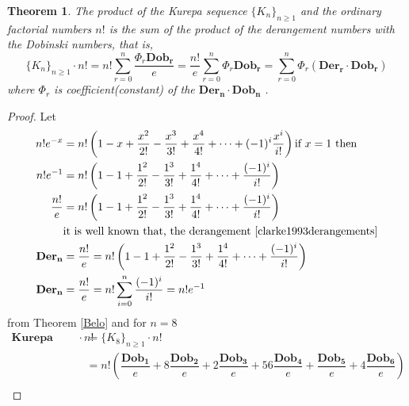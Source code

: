 \documentclass[pdflatex,sn-mathphys-num]{sn-jnl}%
\newtheorem{theorem}{Theorem}
\theoremstyle{thmstyleone}%
\theoremstyle{thmstyletwo}%
\theoremstyle{thmstylethree}%
\begin{document}
\begin{theorem}\label{ok}
    The product of the Kurepa sequence $ \lbrace K_n\rbrace_{n\geq 1}$ and the ordinary factorial numbers $n!$ is the sum of the product of the derangement numbers with the Dobinski numbers, that is, 
        $$\lbrace K_n\rbrace_{n\geq 1} \cdotp n!= n!\sum_{r=0}^{n} \dfrac{\Phi_r \mathbf{Dob_r}}{e} = \dfrac{n!}{e}  \sum_{r=0}^{n} \Phi_r \mathbf{Dob_r}=\sum_{r=0}^{n} \Phi_r (\mathbf{Der_r \cdotp Dob_r})$$
        where $\Phi_r$ is coefficient(constant) of the $\mathbf{Der_n \cdotp Dob_n}$ .
\end{theorem}



\begin{proof}
Let
\begin{align*}
n!e^{-x}& = n!\left( 1-x + \frac{x^{2}}{2!} - \frac{x^3}{3!} + \frac{x^4}{4!} + \cdots + (-1)^i\frac{x^i}{i!}\right)\mbox{if $x=1$ then}\\
n!e^{-1}& = n!\left( 1- 1 + \frac{1^{2}}{2!} - \frac{1^3}{3!} + \frac{1^4}{4!} + \cdots + \frac{(-1)^i}{i!}\right)\\
\frac{n!}{e} &= n!\left( 1-1 + \frac{1^2}{2!} - \frac{1^3}{3!} + \frac{1^4}{4!}+ \cdots +\frac{(-1)^i}{i!} \right)\\
&\mbox{it is well known that, the derangement \cite{clarke1993derangements}}\\
\mathbf{Der_n}&= \frac{n!}{e} = n! \left( 1-1 + \frac{1^2}{2!} - \frac{1^3}{3!} + \frac{1^4}{4!}+ \cdots +\frac{(-1)^i}{i!} \right)\\
\mathbf{Der_n}&= \frac{n!}{e} = n!\sum_{i=0}^n\frac{(-1)^i}{i!} = n!e^{-1}
\end{align*}
from Theorem \ref{Belo} and for $n=8$
  \begin{align*}
      \textbf{Kurepa sequence} \cdotp n!&=  \lbrace K_8\rbrace_{n\geq 1} \cdotp n! \\
      &=n! \left(  \dfrac{\mathbf{Dob_1} }{e} + 8\dfrac{\mathbf{Dob_2}}{e} +2\dfrac{\mathbf{Dob_3}}{e}+ 56\dfrac{\mathbf{Dob_4}}{e}+ \dfrac{\mathbf{Dob_5}}{e}+ 4\dfrac{\mathbf{Dob_6}}{e}\right) \\

\end{align*}
\end{proof}
\end{document}
